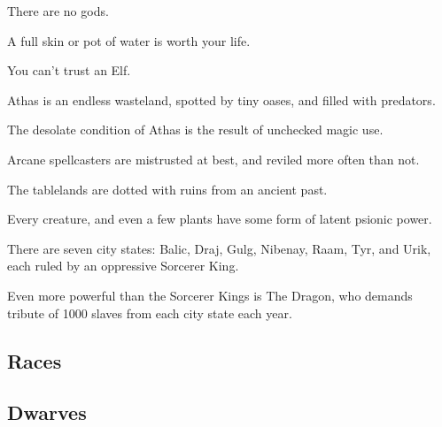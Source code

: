 \begin{multicols}{2}

\begin{description}
    \item There are no gods.
    \item A full skin or pot of water is worth your life.
    \item You can’t trust an Elf.
    \item Athas is an endless wasteland, spotted by tiny oases, and filled with predators.
    \item The desolate condition of Athas is the result of unchecked magic use.
    \item Arcane spellcasters are mistrusted at best, and reviled more often than not.
    \item The tablelands are dotted with ruins from an ancient past.
    \item Every creature, and even a few plants have some form of latent psionic power.
    \item There are seven city states: Balic, Draj, Gulg, Nibenay, Raam, Tyr, and Urik, each ruled by an oppressive Sorcerer King.
    \item Even more powerful than the Sorcerer Kings is The Dragon, who demands tribute of 1000 slaves from each city state each year.
\end{description}

\subsection{Races}
\subsection{Dwarves}


\end{multicols}
